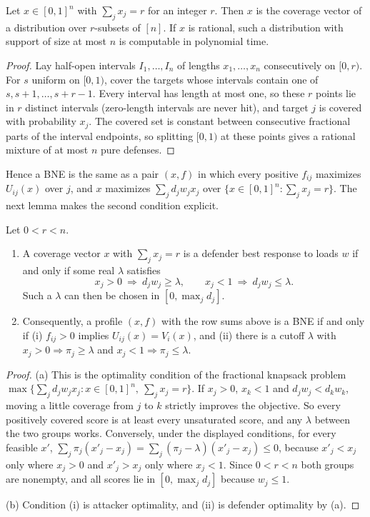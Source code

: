 \begin{lemma}\label{lem:realize}
\statusrefereed
Let $x\in[0,1]^n$ with $\sum_jx_j=r$ for an integer $r$. Then $x$ is the coverage vector of a
distribution over $r$-subsets of $[n]$. If $x$ is rational, such a distribution with support of size
at most $n$ is computable in polynomial time.
\end{lemma}

\begin{proof}
Lay half-open intervals $I_1,\dots,I_n$ of lengths $x_1,\dots,x_n$ consecutively on $[0,r)$. For $s$
uniform on $[0,1)$, cover the targets whose intervals contain one of $s,s+1,\dots,s+r-1$. Every
interval has length at most one, so these $r$ points lie in $r$ distinct intervals (zero-length
intervals are never hit), and target $j$ is covered with probability $x_j$. The covered set is
constant between consecutive fractional parts of the interval endpoints, so splitting $[0,1)$ at these
points gives a rational mixture of at most $n$ pure defenses.
\end{proof}

Hence a BNE is the same as a pair $(x,f)$ in which every positive $f_{ij}$ maximizes $U_{ij}(x)$ over
$j$, and $x$ maximizes $\sum_jd_jw_jx_j$ over $\{x\in[0,1]^n:\sum_jx_j=r\}$. The next lemma makes the
second condition explicit.

\begin{lemma}\label{lem:cutoff}
\statusrefereed
Let $0<r<n$.
\begin{enumerate}[nosep,label=(\alph*)]
\item A coverage vector $x$ with $\sum_jx_j=r$ is a defender best response to loads $w$ if and only if
some real $\lambda$ satisfies
\[
x_j>0\ \Longrightarrow\ d_jw_j\ge\lambda,\qquad x_j<1\ \Longrightarrow\ d_jw_j\le\lambda .
\]
Such a $\lambda$ can then be chosen in $[0,\max_jd_j]$.
\item Consequently, a profile $(x,f)$ with the row sums above is a BNE if and only if (i) $f_{ij}>0$
implies $U_{ij}(x)=V_i(x)$, and (ii) there is a cutoff $\lambda$ with $x_j>0\Rightarrow\pi_j\ge\lambda$
and $x_j<1\Rightarrow\pi_j\le\lambda$.
\end{enumerate}
\end{lemma}

\begin{proof}
(a) This is the optimality condition of the fractional knapsack problem
$\max\{\sum_jd_jw_jx_j:x\in[0,1]^n,\ \sum_jx_j=r\}$. If $x_j>0$, $x_k<1$ and $d_jw_j<d_kw_k$, moving a
little coverage from $j$ to $k$ strictly improves the objective. So every positively covered score is
at least every unsaturated score, and any $\lambda$ between the two groups works. Conversely, under the
displayed conditions, for every feasible $x'$,
$\sum_j\pi_j(x'_j-x_j)=\sum_j(\pi_j-\lambda)(x'_j-x_j)\le0$, because $x'_j<x_j$ only where $x_j>0$ and
$x'_j>x_j$ only where $x_j<1$. Since $0<r<n$ both groups are nonempty, and all scores lie in
$[0,\max_jd_j]$ because $w_j\le1$.

(b) Condition (i) is attacker optimality, and (ii) is defender optimality by (a).
\end{proof}

